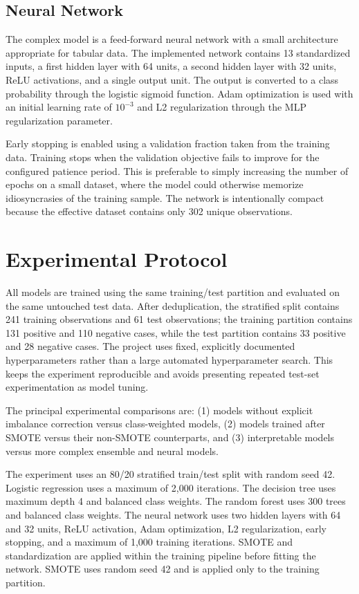 \documentclass[10pt]{article}
\begin{document}
\subsection{Neural Network}
The complex model is a feed-forward neural network with a small architecture appropriate for tabular data. The implemented network contains 13 standardized inputs, a first hidden layer with 64 units, a second hidden layer with 32 units, ReLU activations, and a single output unit. The output is converted to a class probability through the logistic sigmoid function. Adam optimization is used with an initial learning rate of $10^{-3}$ and L2 regularization through the MLP regularization parameter.

Early stopping is enabled using a validation fraction taken from the training data. Training stops when the validation objective fails to improve for the configured patience period. This is preferable to simply increasing the number of epochs on a small dataset, where the model could otherwise memorize idiosyncrasies of the training sample. The network is intentionally compact because the effective dataset contains only 302 unique observations.

\section{Experimental Protocol}
All models are trained using the same training/test partition and evaluated on the same untouched test data. After deduplication, the stratified split contains 241 training observations and 61 test observations; the training partition contains 131 positive and 110 negative cases, while the test partition contains 33 positive and 28 negative cases. The project uses fixed, explicitly documented hyperparameters rather than a large automated hyperparameter search. This keeps the experiment reproducible and avoids presenting repeated test-set experimentation as model tuning.

The principal experimental comparisons are: (1) models without explicit imbalance correction versus class-weighted models, (2) models trained after SMOTE versus their non-SMOTE counterparts, and (3) interpretable models versus more complex ensemble and neural models.

The experiment uses an 80/20 stratified train/test split with random seed 42. Logistic regression uses a maximum of 2,000 iterations. The decision tree uses maximum depth 4 and balanced class weights. The random forest uses 300 trees and balanced class weights. The neural network uses two hidden layers with 64 and 32 units, ReLU activation, Adam optimization, L2 regularization, early stopping, and a maximum of 1,000 training iterations. SMOTE and standardization are applied within the training pipeline before fitting the network. SMOTE uses random seed 42 and is applied only to the training partition.
\end{document}
